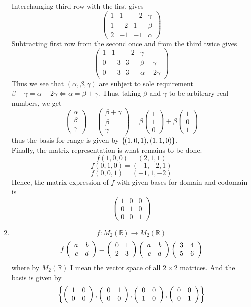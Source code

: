 \documentclass[12pt]{article} %
\begin{document}
\begin{enumerate}
	Interchanging third row with the first gives
	\[\left(\begin{array}{rrr|r}1&1&-2&\gamma\\1&-2&1&\beta\\2&-1&-1&\alpha\end{array}\right)\]
	Subtracting first row from the second once and from the third twice gives
	\[\left(\begin{array}{rrr|r}1&1&-2&\gamma\\0&-3&3&\beta-\gamma\\0&-3&3&\alpha-2\gamma\end{array}\right)\]
	Thus we see that $(\alpha,\beta,\gamma)$ are subject to sole requirement $\beta-\gamma=\alpha-2\gamma\iff
	\alpha=\beta+\gamma$. Thus, taking $\beta$ and $\gamma$ to be arbitrary real numbers, we get
	\[\begin{pmatrix}\alpha\\\beta\\\gamma\end{pmatrix}=\begin{pmatrix}\beta+\gamma\\\beta\\\gamma\end{pmatrix}=
		\beta\begin{pmatrix}1\\1\\0\end{pmatrix}+\beta\begin{pmatrix}1\\0\\1\end{pmatrix}\]
	thus the basis for range is given by $\left\{(1,0,1),(1,1,0)\right\}$.\\
	Finally, the matrix representation is what remains to be done.
	\[f(1,0,0)=(2,1,1)\]
	\[f(0,1,0)=(-1,-2,1)\]
	\[f(0,0,1)=(-1,1,-2)\]
	Hence, the matrix expression of $f$ with given bases for domain and codomain is
	\[\left(\begin{array}{rrr}1&0&0\\0&1&0\\0&0&1\end{array}\right)\]
\item \[f:M_2(\mathbb{R})\to M_2(\mathbb{R})\]
	\[f\left(\begin{array}{rr}a&b\\c&d\end{array}\right)=\left(\begin{array}{rr}0&1\\2&3\end{array}\right)\left(\begin{array}{rr}a&b\\c&d\end{array}\right)\left(\begin{array}{rr}3&4\\5&6\end{array}\right)\]
	where by $M_2(\mathbb{R})$ I mean the vector space of all $2\times2$ matrices. And the basis is given by
	\[\left\{\left(\begin{array}{rr}1&0\\0&0\end{array}\right),\left(\begin{array}{rr}0&1\\0&0\end{array}\right),\left(\begin{array}{rr}0&0\\1&0\end{array}\right),\left(\begin{array}{rr}0&0\\0&1\end{array}\right)\right\}\]

\end{enumerate}
\end{document}
